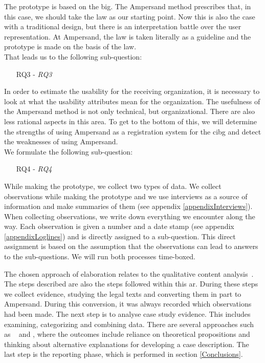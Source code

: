 The prototype is based on the \acrshort{big}.
The Ampersand method prescribes that, in this case, we should take the law as our starting point.
Now this is also the case with a traditional design, but there is an interpretation battle over the user representation.
At Ampersand, the law is taken literally as a guideline and the prototype is made on the basis of the law.
\\That leads us to the following sub-question:
\begin{enumerate}
    \item[RQ3]- \textit{\acrlong{RQ3}}
\end{enumerate}

In order to estimate the usability for the receiving organization, it is necessary to look at what the usability attributes mean for the organization.
The usefulness of the Ampersand method is not only technical, but organizational.
There are also less rational aspects in this area.
To get to the bottom of this, we will determine the strengths of using Ampersand as a registration system for the \acrshort{cibg} and detect the weaknesses of using Ampersand.
\\We formulate the following sub-question:
\begin{enumerate}
    \item[RQ4]- \textit{\acrlong{RQ4}}
\end{enumerate}

While making the prototype, we collect two types of data.
We collect observations while making the prototype and we use interviews as a source of information and make summaries of them (see appendix \ref{appendixInterviews}).
When collecting observations, we write down everything we encounter along the way.
Each observation is given a number and a date stamp (see appendix \ref{appendixLoglines}) and is directly assigned to a sub-question.
This direct assignment is based on the assumption that the observations can lead to answers to the sub-questions.
We will run both processes time-boxed.

The chosen approach of elaboration relates to the qualitative content analysis~\citep{kohlbacher_use_2006}.
The steps described are also the steps followed within this \acrshort{ar}.
During these steps we collect evidence, studying the legal texts and converting them in part to Ampersand.
During this conversion, it was always recorded which observations had been made.
The next step is to analyse case study evidence.
This includes examining, categorizing and combining data.
There are several approaches such as ~\cite{hsieh_three_2005} and \cite{mayring_qualitative_2019}, where the outcomes include reliance on theoretical propositions and thinking about alternative explanations for developing a case description.
The last step is the reporting phase, which is performed in section \ref{Conclusions}.

